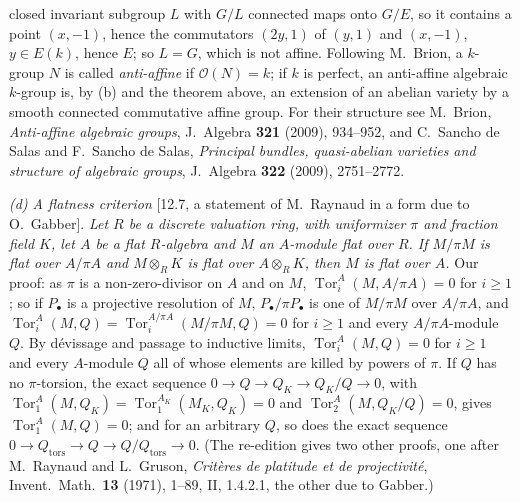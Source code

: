 closed invariant subgroup \(L\) with \(G/L\) connected maps onto \(G/E\), so it contains a
point \((x,-1)\), hence the commutators \((2y,1)\) of \((y,1)\) and \((x,-1)\), \(y\in E(k)\),
hence \(E\); so \(L=G\), which is not affine. Following M.~Brion, a \(k\)-group \(N\) is called
\emph{anti-affine} if \(\mathcal O(N)=k\); if \(k\) is perfect, an anti-affine algebraic
\(k\)-group is, by (b) and the theorem above, an extension of an abelian variety by a smooth
connected commutative affine group. For their structure see M.~Brion, \emph{Anti-affine
algebraic groups}, J.\ Algebra \textbf{321} (2009), 934--952, and C.~Sancho de Salas and
F.~Sancho de Salas, \emph{Principal bundles, quasi-abelian varieties and structure of algebraic
groups}, J.\ Algebra \textbf{322} (2009), 2751--2772.

\par\smallskip\noindent\textit{(d) A flatness criterion} [12.7, a statement of M.~Raynaud in a
form due to O.~Gabber]. \emph{Let \(R\) be a discrete valuation ring, with uniformizer \(\pi\)
and fraction field \(K\), let \(A\) be a flat \(R\)-algebra and \(M\) an \(A\)-module flat over
\(R\). If \(M/\pi M\) is flat over \(A/\pi A\) and \(M\otimes_RK\) is flat over \(A\otimes_RK\),
then \(M\) is flat over \(A\).} Our proof: as \(\pi\) is a non-zero-divisor on \(A\) and on
\(M\), \(\operatorname{Tor}^A_i(M,A/\pi A)=0\) for \(i\geq1\); so if \(P_\bullet\) is a
projective resolution of \(M\), \(P_\bullet/\pi P_\bullet\) is one of \(M/\pi M\) over
\(A/\pi A\), and \(\operatorname{Tor}^A_i(M,Q)=\operatorname{Tor}^{A/\pi A}_i(M/\pi M,Q)=0\)
for \(i\geq1\) and every \(A/\pi A\)-module \(Q\). By d\'evissage and passage to inductive
limits, \(\operatorname{Tor}^A_i(M,Q)=0\) for \(i\geq1\) and every \(A\)-module \(Q\) all of
whose elements are killed by powers of \(\pi\). If \(Q\) has no \(\pi\)-torsion, the exact
sequence \(0\to Q\to Q_K\to Q_K/Q\to0\), with
\(\operatorname{Tor}^A_1(M,Q_K)=\operatorname{Tor}^{A_K}_1(M_K,Q_K)=0\) and
\(\operatorname{Tor}^A_2(M,Q_K/Q)=0\), gives \(\operatorname{Tor}^A_1(M,Q)=0\); and for an
arbitrary \(Q\), so does the exact sequence \(0\to Q_{\mathrm{tors}}\to Q\to
Q/Q_{\mathrm{tors}}\to0\). (The re-edition gives two other proofs, one after M.~Raynaud and
L.~Gruson, \emph{Crit\`eres de platitude et de projectivit\'e}, Invent.\ Math.\ \textbf{13}
(1971), 1--89, II, 1.4.2.1, the other due to Gabber.)

